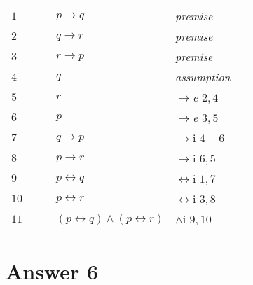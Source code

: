 \documentclass[12pt]{article}
\begin{document}
\begin{table}[H]
	
	\begin{tabular}{*6{l}}
		$1$ & & & $p \rightarrow q$ & \textit{premise} & \\ 
		$2$ & & & $q \rightarrow r$ & \textit{premise} & \\ 
		$3$ & & & $r \rightarrow p$ & \textit{premise} & \\ \cline{2-6}
		$4$ &\multicolumn{1}{|c}{} & & $q$ &\textit{assumption} &\multicolumn{1}{c|}{}\\ 
		$5$ &\multicolumn{1}{|c}{} & & $r$ &\textit{$\rightarrow$e $ 2,4$} &\multicolumn{1}{c|}{}\\ 
		$6$ &\multicolumn{1}{|c}{} & & $p$ &\textit{$\rightarrow$e  $3,5$} &\multicolumn{1}{c|}{}\\  \cline{2-6}
		$7$ & & & $q \rightarrow p$ & $\rightarrow$i $4-6$ & \\
		$8$ & & & $p \rightarrow r$ & $\rightarrow$i $6,5$ & \\
		$9$ & & & $p \leftrightarrow q$ & $\leftrightarrow$i $1,7$ & \\
		$10$ & & & $p \leftrightarrow r$ & $\leftrightarrow$i $3,8$ & \\
		$11$ & & & $(p \leftrightarrow q) \wedge (p \leftrightarrow r)$ & $\wedge$i $9,10$ & \\
	\end{tabular}
\end{table}


\section*{Answer 6}
\end{document}
